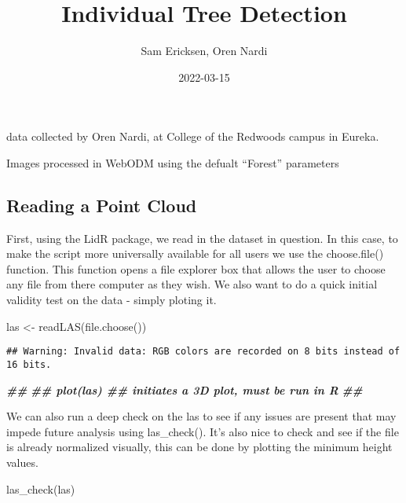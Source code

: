 \documentclass[
]{article}
\title{Individual Tree Detection}
\author{Sam Ericksen, Oren Nardi}
\date{2022-03-15}
\newenvironment{Shaded}{\begin{snugshade}}{\end{snugshade}}
\newcommand{\DocumentationTok}[1]{\textcolor[rgb]{0.56,0.35,0.01}{\textbf{\textit{#1}}}}
\newcommand{\FunctionTok}[1]{\textcolor[rgb]{0.00,0.00,0.00}{#1}}
\newcommand{\NormalTok}[1]{#1}
\newcommand{\OtherTok}[1]{\textcolor[rgb]{0.56,0.35,0.01}{#1}}
\begin{document}
\maketitle

data collected by Oren Nardi, at College of the Redwoods campus in
Eureka.

Images processed in WebODM using the defualt ``Forest'' parameters

\hypertarget{reading-a-point-cloud}{%
\subsection{Reading a Point Cloud}\label{reading-a-point-cloud}}

First, using the LidR package, we read in the dataset in question. In
this case, to make the script more universally available for all users
we use the choose.file() function. This function opens a file explorer
box that allows the user to choose any file from there computer as they
wish. We also want to do a quick initial validity test on the data -
simply ploting it.

\begin{Shaded}
\begin{Highlighting}[]
\NormalTok{las }\OtherTok{\textless{}{-}} \FunctionTok{readLAS}\NormalTok{(}\FunctionTok{file.choose}\NormalTok{())}
\end{Highlighting}
\end{Shaded}

\begin{verbatim}
## Warning: Invalid data: RGB colors are recorded on 8 bits instead of 16 bits.
\end{verbatim}

\begin{Shaded}
\begin{Highlighting}[]
\DocumentationTok{\#\# }
\DocumentationTok{\#\# plot(las) \#\# initiates a 3D plot, must be run in R}
\DocumentationTok{\#\# }
\end{Highlighting}
\end{Shaded}

We can also run a deep check on the las to see if any issues are present
that may impede future analysis using las\_check(). It's also nice to
check and see if the file is already normalized visually, this can be
done by plotting the minimum height values.

\begin{Shaded}
\begin{Highlighting}[]
\FunctionTok{las\_check}\NormalTok{(las)}
\end{Highlighting}
\end{Shaded}
\end{document}
